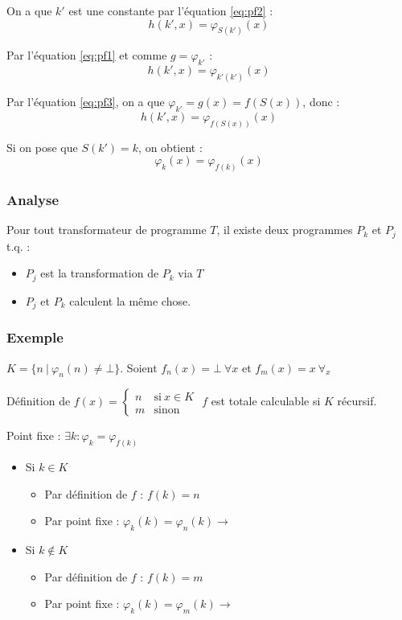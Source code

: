 \medskip

On a que $k'$ est une constante par l'équation \ref{eq:pf2} :
\begin{equation*}
h(k',x) = \varphi_{S(k')}(x)
\end{equation*}

Par l'équation \ref{eq:pf1} et comme $g = \varphi_{k'}$ :
\begin{equation*}
h(k',x) = \varphi_{k'(k')}(x)
\end{equation*}

Par l'équation \ref{eq:pf3}, on a que $\varphi_{k'} = g(x) = f(S(x))$, donc :
\begin{equation*}
h(k',x) = \varphi_{f(S(x))}(x)
\end{equation*}

Si on pose que $S(k') = k$, on obtient :
\begin{equation*}
\varphi_k(x) = \varphi_{f(k)}(x)
\end{equation*}

\subsubsection{Analyse}

Pour tout transformateur de programme $T$, il existe deux programmes $P_k$ et $P_j$ t.q. :
\begin{itemize}
\item $P_j$ est la transformation de $P_k$ via $T$
\item $P_j$ et $P_k$ calculent la même chose.
\end{itemize}

\subsubsection{Exemple}

$K = \{n\ |\ \varphi_n(n) \neq \bot \}$. Soient $f_n(x) = \bot\ \forall x$ et $f_m(x) = x\ \forall_x$

Définition de $f(x) =
\begin{cases}
	n & \text{si}\ x \in K\\
	m & \text{sinon}
\end{cases}$ $f$ est totale calculable si $K$ récursif.

Point fixe : $\exists k : \varphi_k = \varphi_{f(k)}$
\begin{itemize}
\item Si $k \in K$
	\begin{itemize}
	\item Par définition de $f$ : $f(k) = n$
	\item Par point fixe : $\varphi_k (k) = \varphi_n(k) \rightarrow$ 
	\end{itemize}
\item Si $k \notin K$
	\begin{itemize}
	\item Par définition de $f$ : $f(k) = m$
	\item Par point fixe : $\varphi_k(k) = \varphi_m(k) \rightarrow$ 
	\end{itemize}
\end{itemize}

